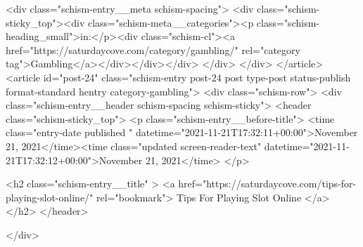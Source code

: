 {		<div class="schism-entry__meta schism-spacing">			<div class="schism-sticky_top"><div class="schism-meta__categories"><p class="schism-heading_small">in:</p><div class="schism-cl"><a href="https://saturdaycove.com/category/gambling/" rel="category tag">Gambling</a></div></div></div>		</div>
	</div>
</article>
<article id="post-24" class="schism-entry post-24 post type-post status-publish format-standard hentry category-gambling">
	<div class="schism-row">		<div class="schism-entry__header schism-spacing schism-sticky">			<header class="schism-sticky_top">				<p class="schism-entry__before-title">
					<time class="entry-date published " datetime="2021-11-21T17:32:11+00:00">November 21, 2021</time><time class="updated screen-reader-text" datetime="2021-11-21T17:32:12+00:00">November 21, 2021</time>				</p>

				<h2 class="schism-entry__title" >
					<a href="https://saturdaycove.com/tips-for-playing-slot-online/" rel="bookmark">
						Tips For Playing Slot Online					</a>
				</h2>
			</header>

					</div>

}
